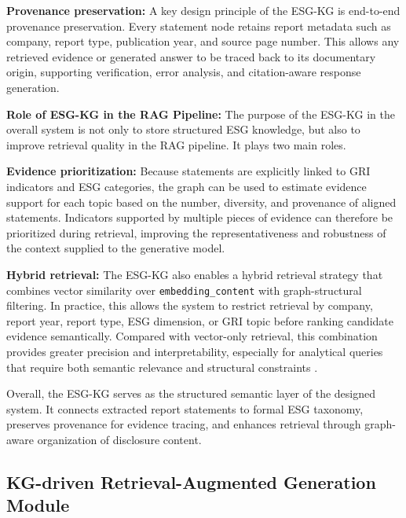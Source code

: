 \documentclass[sn-mathphys, oneside]{sn-jnl}
\begin{document}
\textbf{Provenance preservation:}
A key design principle of the ESG-KG is end-to-end provenance preservation. Every
statement node retains report metadata such as company, report type, publication year,
and source page number. This allows any retrieved evidence or generated answer to be
traced back to its documentary origin, supporting verification, error analysis, and
citation-aware response generation.

\textbf{Role of ESG-KG in the RAG Pipeline:} The purpose of the ESG-KG in the overall system is not only to store structured ESG
knowledge, but also to improve retrieval quality in the RAG pipeline. It plays two
main roles.

\textbf{Evidence prioritization:}
Because statements are explicitly linked to GRI indicators and ESG categories, the graph
can be used to estimate evidence support for each topic based on the number, diversity,
and provenance of aligned statements. Indicators supported by multiple pieces of
evidence can therefore be prioritized during retrieval, improving the representativeness
and robustness of the context supplied to the generative model.

\textbf{Hybrid retrieval:}
The ESG-KG also enables a hybrid retrieval strategy that combines vector similarity over
\texttt{embedding\_content} with graph-structural filtering. In practice, this allows
the system to restrict retrieval by company, report year, report type, ESG dimension,
or GRI topic before ranking candidate evidence semantically. Compared with vector-only
retrieval, this combination provides greater precision and interpretability, especially
for analytical queries that require both semantic relevance and structural constraints
\cite{zhu2023llm}.

Overall, the ESG-KG serves as the structured semantic layer of the designed system. It
connects extracted report statements to formal ESG taxonomy, preserves provenance for
evidence tracing, and enhances retrieval through graph-aware organization of disclosure
content.



\subsection{KG-driven Retrieval-Augmented Generation Module}
\label{subsec:kg-rag}
\end{document}
